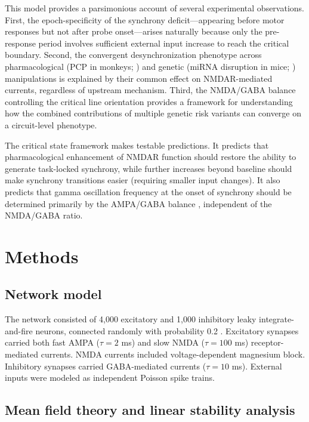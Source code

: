 \documentclass[11pt]{article}
\begin{document}
This model provides a parsimonious account of several experimental observations. First, the epoch-specificity of the synchrony deficit---appearing before motor responses but not after probe onset---arises naturally because only the pre-response period involves sufficient external input increase to reach the critical boundary. Second, the convergent desynchronization phenotype across pharmacological (PCP in monkeys; \citealp{zick2018}) and genetic (miRNA disruption in mice; \citealp{kummerfeld2020}) manipulations is explained by their common effect on NMDAR-mediated currents, regardless of upstream mechanism. Third, the NMDA/GABA balance controlling the critical line orientation provides a framework for understanding how the combined contributions of multiple genetic risk variants \citep{ripke2014} can converge on a circuit-level phenotype.

The critical state framework makes testable predictions. It predicts that pharmacological enhancement of NMDAR function should restore the ability to generate task-locked synchrony, while further increases beyond baseline should make synchrony transitions easier (requiring smaller input changes). It also predicts that gamma oscillation frequency at the onset of synchrony should be determined primarily by the AMPA/GABA balance \citep{tiesinga2009}, independent of the NMDA/GABA ratio.

\section{Methods}

\subsection{Network model}

The network consisted of 4,000 excitatory and 1,000 inhibitory leaky integrate-and-fire neurons, connected randomly with probability 0.2 \citep{brunel2000}. Excitatory synapses carried both fast AMPA ($\tau = 2$ ms) and slow NMDA ($\tau = 100$ ms) receptor-mediated currents. NMDA currents included voltage-dependent magnesium block. Inhibitory synapses carried GABA-mediated currents ($\tau = 10$ ms). External inputs were modeled as independent Poisson spike trains.

\subsection{Mean field theory and linear stability analysis}
\end{document}
